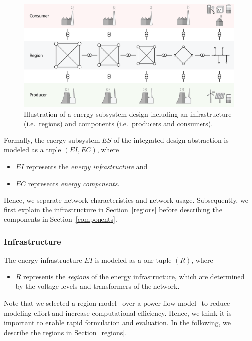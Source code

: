 \begin{figure}[t!]
	\begin{center}
	\includegraphics[trim=0 10 0 15, width=0.95\columnwidth]{./gfx/energy_system.png}
	\caption{Illustration of a energy subsystem design including an infrastructure (i.e.\ regions) and components (i.e.\ producers and consumers).}
	\label{energy_illustration}
	\end{center}
\end{figure}

Formally, the energy subsystem $ES$ of the integrated design abstraction is modeled as a tuple $(EI, EC)$, where
\begin{itemize}
	\item $EI$ represents the \textit{energy infrastructure} and
	\item $EC$ represents \textit{energy components}.
\end{itemize}
Hence, we separate network characteristics and network usage. Subsequently, we first explain the infrastructure in Section~\ref{regions} before describing the components in Section~\ref{components}.

\subsubsection{Infrastructure}
\label{energy_infrastructure}

The energy infrastructure $EI$ is modeled as a one-tuple $(R)$, where
\begin{itemize}
	\item $R$ represents the \textit{regions} of the energy infrastructure, which are determined by the voltage levels and transformers of the network.
\end{itemize}
Note that we selected a region model~\cite{Hackenberg2012} over a power flow model~\cite{Dommel1968} to reduce modeling effort and increase computational efficiency. Hence, we think it is important to enable rapid formulation and evaluation. In the following, we describe the regions in Section~\ref{regions}.

